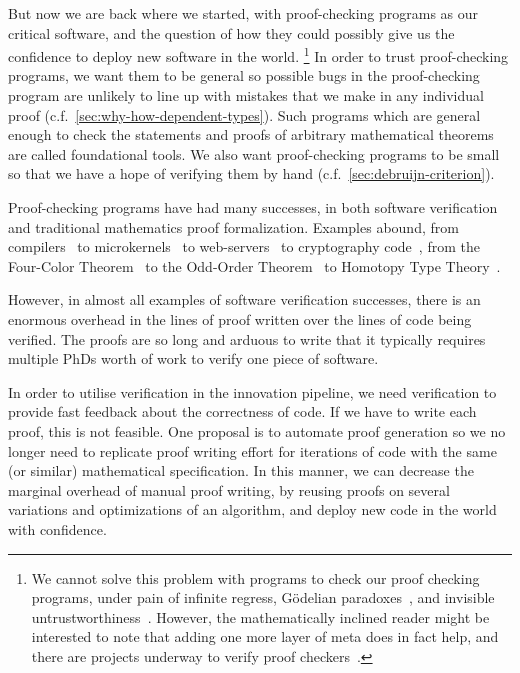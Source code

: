 But now we are back where we started, with proof-checking programs as our critical software, and the question of how they could possibly give us the confidence to deploy new software in the world.%
\footnote{%
  We cannot solve this problem with programs to check our proof checking programs, under pain of infinite regress, Gödelian paradoxes~\cite{sep-goedel-incompleteness}, and invisible untrustworthiness~\cite{Reflections1984Thompson}.
  However, the mathematically inclined reader might be interested to note that adding one more layer of meta does in fact help, and there are projects underway to verify proof checkers~\cite{nuprl-in-coq,coq-coq-correct,certicoq}.
}
In order to trust proof-checking programs, we want them to be general so possible bugs in the proof-checking program are unlikely to line up with mistakes that we make in any individual proof (c.f.~\autoref{sec:why-how-dependent-types}).
Such programs which are general enough to check the statements and proofs of arbitrary mathematical theorems are called foundational tools.
We also want proof-checking programs to be small so that we have a hope of verifying them by hand (c.f.~\autoref{sec:debruijn-criterion}).


Proof-checking programs have had many successes, in both software verification and traditional mathematics proof formalization.
Examples abound, from compilers~\cite{Compcert} to microkernels~\cite{seL4SOSP09} to web-servers~\cite{Network2015Chlipala} to cryptography code~\cite{FiatCryptoSP19}, from the Four-Color Theorem~\cite{gonthier2008formal} to the Odd-Order Theorem~\cite{gonthier2013machine} to Homotopy Type Theory~\cite{HoTTBook}.

However, in almost all examples of software verification successes, there is an enormous overhead in the lines of proof written over the lines of code being verified.
The proofs are so long and arduous to write that it typically requires multiple PhDs worth of work to verify one piece of software.
\label{sec:manual-proof-long}

In order to utilise verification in the innovation pipeline, we need verification to provide fast feedback about the correctness of code. 
If we have to write each proof, this is not feasible. 
One proposal is to automate proof generation so we no longer need to replicate proof writing effort for iterations of code with the same (or similar) mathematical specification.
In this manner, we can decrease the marginal overhead of manual proof writing, by reusing proofs on several variations and optimizations of an algorithm, and deploy new code in the world with confidence. 

